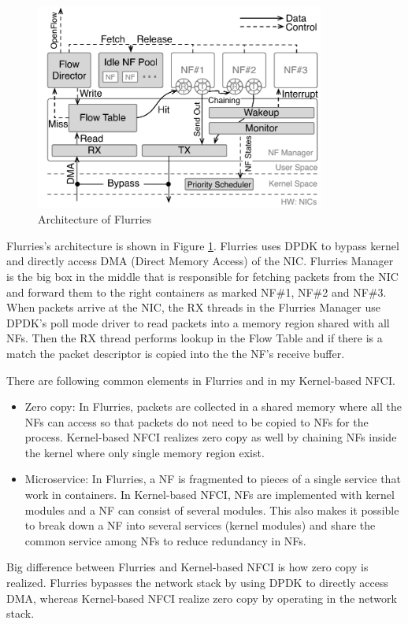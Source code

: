 \begin{figure}
	\centering
	\includegraphics[width=95mm]{pics/flurries_arc.pdf}
	\caption{Architecture of Flurries}
	\label{fig: flurries_arc}
\end{figure} 

Flurries's architecture is shown in Figure \ref{fig: flurries_arc}. Flurries uses DPDK to bypass kernel and directly access DMA\cite{DMA} (Direct Memory Access) of the NIC. Flurries Manager is the big box in the middle that is responsible for fetching packets from the NIC and forward them to the right containers as marked NF\#1, NF\#2 and NF\#3. When packets arrive at the NIC, the RX threads in the Flurries Manager use DPDK's poll mode driver to read packets into a memory region shared with all NFs. Then the RX thread performs lookup in the Flow Table and if there is a match the packet descriptor is copied into the the NF's receive buffer.  

There are following common elements in Flurries and in my Kernel-based NFCI.
\begin{itemize}
	\item Zero copy: In Flurries, packets are collected in a shared memory where all the NFs can access so that packets do not need to be copied to NFs for the process. Kernel-based NFCI realizes zero copy as well by chaining NFs inside the kernel where only single memory region exist. 
	\item Microservice: In Flurries, a NF is fragmented to pieces of a single service that work in containers. In Kernel-based NFCI, NFs are implemented with kernel modules and a NF can consist of several modules. This also makes it possible to break down a NF into several services (kernel modules) and share the common service among NFs to reduce redundancy in NFs. 
\end{itemize}

Big difference between Flurries and Kernel-based NFCI is how zero copy is realized. Flurries bypasses the network stack by using DPDK to directly access DMA, whereas Kernel-based NFCI realize zero copy by operating in the network stack. 

